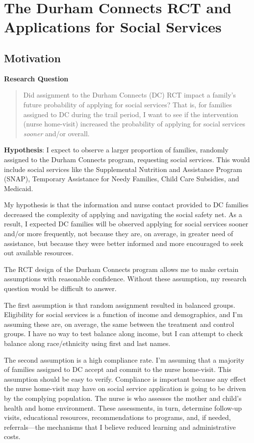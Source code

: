 \documentclass[12pt,letterpaperpaper,]{book}
\begin{document}
\chapter{The Durham Connects RCT and Applications for Social
Services}\label{chapter-2}

\section*{Motivation}\label{motivation-1}

\textbf{Research Question}

\begin{quote}
Did assignment to the Durham Connects (DC) RCT impact a family's future
probability of applying for social services? That is, for families
assigned to DC during the trail period, I want to see if the
intervention (nurse home-visit) increased the probability of applying
for social services \emph{sooner} and/or overall.
\end{quote}

\textbf{Hypothesis}: I expect to observe a larger proportion of
families, randomly assigned to the Durham Connects program, requesting
social services. This would include social services like the
Supplemental Nutrition and Assistance Program (SNAP), Temporary
Assistance for Needy Families, Child Care Subsidies, and Medicaid.

My hypothesis is that the information and nurse contact provided to DC
families decreased the complexity of applying and navigating the social
safety net. As a result, I expected DC families will be observed
applying for social services sooner and/or more frequently, not because
they are, on average, in greater need of assistance, but because they
were better informed and more encouraged to seek out available
resources.

The RCT design of the Durham Connects program allows me to make certain
assumptions with reasonable confidence. Without these assumption, my
research question would be difficult to answer.

The first assumption is that random assignment resulted in balanced
groups. Eligibility for social services is a function of income and
demographics, and I'm assuming these are, on average, the same between
the treatment and control groups. I have no way to test balance along
income, but I can attempt to check balance along race/ethnicity using
first and last names.

The second assumption is a high compliance rate. I'm assuming that a
majority of families assigned to DC accept and commit to the nurse
home-visit. This assumption should be easy to verify. Compliance is
important because any effect the nurse home-visit may have on social
service application is going to be driven by the complying population.
The nurse is who assesses the mother and child's health and home
environment. These assessments, in turn, determine follow-up visits,
educational resources, recommendations to programs, and, if needed,
referrals---the mechanisms that I believe reduced learning and
administrative costs.
\end{document}

